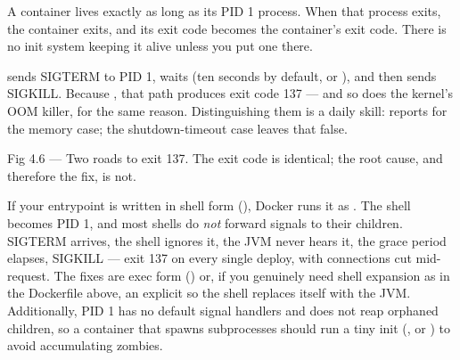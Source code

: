 
 A container lives exactly as long as its PID 1 process. When that process exits, the container exits, and its exit code becomes the container's exit code. There is no init system keeping it alive unless you put one there.

  sends SIGTERM to PID 1, waits (ten seconds by default, or ), and then sends SIGKILL. Because , that path produces exit code 137 --- and so does the kernel's OOM killer, for the same reason. Distinguishing them is a daily skill:  reports  for the memory case; the shutdown-timeout case leaves that false.

\begin{wbfigure}{Fig 4.6 — Two roads to exit 137. The exit code is identical; the root cause, and therefore the fix, is not.}
\end{wbfigure}

 If your entrypoint is written in shell form (), Docker runs it as . The shell becomes PID 1, and most shells do \emph{not} forward signals to their children. SIGTERM arrives, the shell ignores it, the JVM never hears it, the grace period elapses, SIGKILL --- exit 137 on every single deploy, with connections cut mid-request. The fixes are exec form () or, if you genuinely need shell expansion as in the Dockerfile above, an explicit  so the shell replaces itself with the JVM. Additionally, PID 1 has no default signal handlers and does not reap orphaned children, so a container that spawns subprocesses should run a tiny init (, or ) to avoid accumulating zombies.

